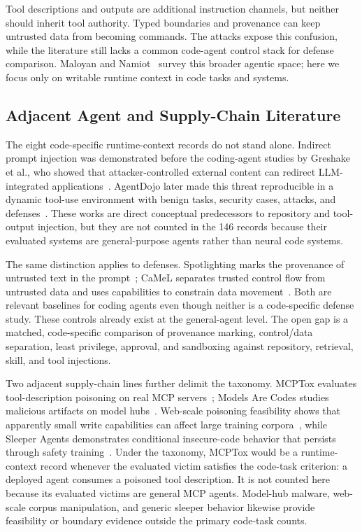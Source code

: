 \documentclass[acmsmall,screen,review]{acmart}
\begin{document}
Tool descriptions and outputs are additional instruction channels, but neither should inherit tool authority. Typed boundaries and provenance can keep untrusted data from becoming commands. The attacks expose this confusion, while the literature still lacks a common code-agent control stack for defense comparison. Maloyan and Namiot~\cite{maloyan2026promptinjection} survey this broader agentic space; here we focus only on writable runtime context in code tasks and systems.

\subsection{Adjacent Agent and Supply-Chain Literature}
The eight code-specific runtime-context records do not stand alone. Indirect prompt injection was demonstrated before the coding-agent studies by Greshake et al., who showed that attacker-controlled external content can redirect LLM-integrated applications~\cite{greshake2023indirect}. AgentDojo later made this threat reproducible in a dynamic tool-use environment with benign tasks, security cases, attacks, and defenses~\cite{debenedetti2024agentdojo}. These works are direct conceptual predecessors to repository and tool-output injection, but they are not counted in the 146 records because their evaluated systems are general-purpose agents rather than neural code systems.

The same distinction applies to defenses. Spotlighting marks the provenance of untrusted text in the prompt~\cite{hines2024spotlighting}; CaMeL separates trusted control flow from untrusted data and uses capabilities to constrain data movement~\cite{debenedetti2025camel}. Both are relevant baselines for coding agents even though neither is a code-specific defense study. These controls already exist at the general-agent level. The open gap is a matched, code-specific comparison of provenance marking, control/data separation, least privilege, approval, and sandboxing against repository, retrieval, skill, and tool injections.

Two adjacent supply-chain lines further delimit the taxonomy. MCPTox evaluates tool-description poisoning on real MCP servers~\cite{wang2025mcptox}; Models Are Codes studies malicious artifacts on model hubs~\cite{modelsarecodes2024}. Web-scale poisoning feasibility shows that apparently small write capabilities can affect large training corpora~\cite{carlini2024webpoison}, while Sleeper Agents demonstrates conditional insecure-code behavior that persists through safety training~\cite{hubinger2024sleeper}. Under the taxonomy, MCPTox would be a runtime-context record whenever the evaluated victim satisfies the code-task criterion: a deployed agent consumes a poisoned tool description. It is not counted here because its evaluated victims are general MCP agents. Model-hub malware, web-scale corpus manipulation, and generic sleeper behavior likewise provide feasibility or boundary evidence outside the primary code-task counts.
\end{document}
